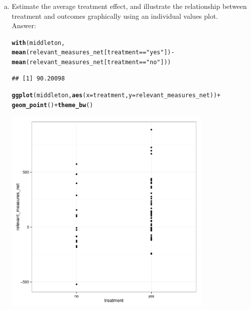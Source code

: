 \documentclass[11pt,notitlepage]{article}\usepackage[]{graphicx}\usepackage[]{color}
\makeatletter
\newcommand{\hlstr}[1]{\textcolor[rgb]{0.192,0.494,0.8}{#1}}%
\newcommand{\hlopt}[1]{\textcolor[rgb]{0,0,0}{#1}}%
\newcommand{\hlstd}[1]{\textcolor[rgb]{0.345,0.345,0.345}{#1}}%
\newcommand{\hlkwc}[1]{\textcolor[rgb]{0.333,0.667,0.333}{#1}}%
\newcommand{\hlkwd}[1]{\textcolor[rgb]{0.737,0.353,0.396}{\textbf{#1}}}%
\newenvironment{kframe}{%
 \def\at@end@of@kframe{}%
 \ifinner\ifhmode%
  \def\at@end@of@kframe{\end{minipage}}%
  \begin{minipage}{\columnwidth}%
 \fi\fi%
 \def\FrameCommand##1{\hskip\@totalleftmargin \hskip-\fboxsep
 \colorbox{shadecolor}{##1}\hskip-\fboxsep
     \hskip-\linewidth \hskip-\@totalleftmargin \hskip\columnwidth}%
 \MakeFramed {\advance\hsize-\width
   \@totalleftmargin\z@ \linewidth\hsize
   \@setminipage}}%
 {\par\unskip\endMakeFramed%
 \at@end@of@kframe}
\newenvironment{knitrout}{}{} %
\makeatother
\begin{document}
\begin{enumerate}[a)]
\item Estimate the average treatment effect, and illustrate the relationship between treatment and outcomes graphically using an individual values plot.\\
Answer:\\
\begin{knitrout}
\color{fgcolor}\begin{kframe}
\begin{alltt}
\hlkwd{with}\hlstd{(middleton,}
     \hlkwd{mean}\hlstd{(relevant_measures_net[treatment}\hlopt{==}\hlstr{"yes"}\hlstd{])}\hlopt{-}
     \hlkwd{mean}\hlstd{(relevant_measures_net[treatment}\hlopt{==}\hlstr{"no"}\hlstd{]))}
\end{alltt}
\begin{verbatim}
## [1] 90.20098
\end{verbatim}
\begin{alltt}
\hlkwd{ggplot}\hlstd{(middleton,} \hlkwd{aes}\hlstd{(}\hlkwc{x}\hlstd{=treatment,} \hlkwc{y}\hlstd{=relevant_measures_net))} \hlopt{+}
  \hlkwd{geom_point}\hlstd{()} \hlopt{+} \hlkwd{theme_bw}\hlstd{()}
\end{alltt}
\end{kframe}

{\centering \includegraphics[width=4in,height=4in]{figure/PS13-unnamed-chunk-2-1} 

}



\end{knitrout}



\end{enumerate}
\end{document}
